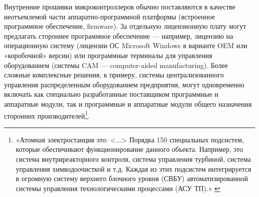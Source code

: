 \documentclass{article}
\begin{document}
Внутренние прошивки микроконтроллеров обычно поставляются в качестве неотъемлемой части аппаратно-программной платформы (встроенное программное обеспечение, firmware). За отдельную лицензионную плату могут предлагать стороннее программное обеспечение — например, лицензию на операционную систему (лицензии ОС Microsoft Windows в варианте OEM или «коробочной» версии) или программные терминалы для управления оборудованием (системы CAM — computer-aided manufacturing). Более сложные комплексные решения, к примеру, системы централизованного управления распределенным оборудованием предприятия, могут одновременно включать как специально разработанные поставщиком программные и аппаратные модули, так и программные и аппаратные модули общего назначения сторонних производителей\footnote{«Атомная электростанция это: <...> Порядка 150 специальных подсистем, которые обеспечивают функционирование данного объекта. Например, это система внутриреакторного контроля, система управления турбиной, система управления химводоочисткой и т.д. Каждая из этих подсистем интегрируется в огромную систему верхнего блочного уровня (СВБУ) автоматизированной системы управления технологическими процессами (АСУ ТП).» \cite{highloadAes2018}}.
\end{document}
